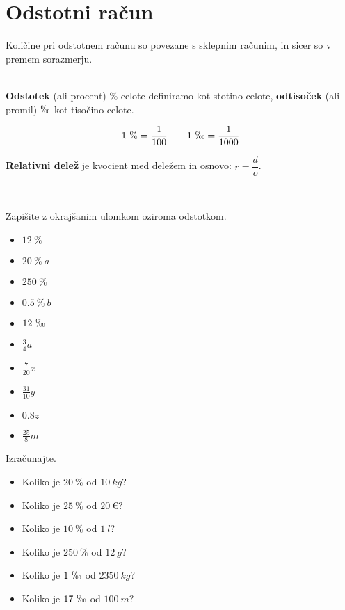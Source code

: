 \section{Odstotni račun}  
        
            Količine pri odstotnem računu so povezane s sklepnim računim, in sicer so v premem sorazmerju.
        
        ~\\
            \textbf{Odstotek} (ali procent) $\text{\%}$ celote definiramo kot stotino celote,
            \textbf{odtisoček} (ali promil) $\permil$ kot tisočino celote.

            $$ 1~\text{\%}=\dfrac{1}{100} \quad \quad {1~\permil=\dfrac{1}{1000}}$$
        

        
            \textbf{Relativni delež} je kvocient med deležem in osnovo: $r=\dfrac{d}{o}$.
        

    
~~~\\
    
        \begin{naloga}
            Zapišite z okrajšanim ulomkom oziroma odstotkom.
            \begin{itemize}
                    \item $12~\%$ 
                    \item $20~\%~a$ 
                    \item $250~\%$ 
                    \item $0.5~\%~b$ 
                    \item $12~\permil$ 
                    \item $\frac{3}{4}a$ 
                    \item $\frac{7}{20}x$ 
                    \item $\frac{31}{10}y$ 
                    \item $0.8 z$ 
                    \item $\frac{25}{8}m$
            \end{itemize}
        \end{naloga}
    


    
        \begin{naloga}
            Izračunajte.
            \begin{itemize}
                    \item Koliko je $20~\%$ od $10~kg$? 
                    \item Koliko je $25~\%$ od $20~€$? 
                    \item Koliko je $10~\%$ od $1~l$? 
                    \item Koliko je $250~\%$ od $12~g$? 
                    \item Koliko je $1~\permil$ od $2350~kg$? 
                    \item Koliko je $17~\permil$ od $100~m$? 
            \end{itemize}
        \end{naloga}
    

